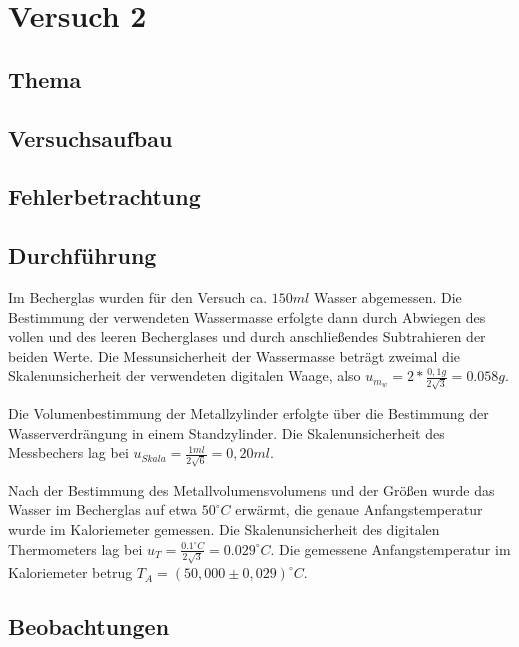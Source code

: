 \documentclass[
  9pt,
]{article}
\begin{document}
\hypertarget{versuch-2}{%
\section{Versuch 2}\label{versuch-2}}

\hypertarget{thema-1}{%
\subsection{Thema}\label{thema-1}}

\hypertarget{versuchsaufbau}{%
\subsection{Versuchsaufbau}\label{versuchsaufbau}}

\hypertarget{fehlerbetrachtung-1}{%
\subsection{Fehlerbetrachtung}\label{fehlerbetrachtung-1}}

\hypertarget{durchfuxfchrung}{%
\subsection{Durchführung}\label{durchfuxfchrung}}

Im Becherglas wurden für den Versuch ca. \(150ml\) Wasser abgemessen.
Die Bestimmung der verwendeten Wassermasse erfolgte dann durch Abwiegen
des vollen und des leeren Becherglases und durch anschließendes
Subtrahieren der beiden Werte. Die Messunsicherheit der Wassermasse
beträgt zweimal die Skalenunsicherheit der verwendeten digitalen Waage,
also \(u_{m_w}=2*\frac{0,1g}{2\sqrt{3}}=0.058g\).

Die Volumenbestimmung der Metallzylinder erfolgte über die Bestimmung
der Wasserverdrängung in einem Standzylinder. Die Skalenunsicherheit des
Messbechers lag bei \(u_{Skala}=\frac{1ml}{2\sqrt{6}}=0,20ml\).

Nach der Bestimmung des Metallvolumensvolumens und der Größen wurde das
Wasser im Becherglas auf etwa \(50^\circ C\) erwärmt, die genaue
Anfangstemperatur wurde im Kaloriemeter gemessen. Die Skalenunsicherheit
des digitalen Thermometers lag bei
\(u_T = \frac{0.1^\circ C}{2\sqrt{3}} = 0.029^\circ C\). Die gemessene
Anfangstemperatur im Kaloriemeter betrug
\(T_A=(50,000\pm 0,029)^\circ C\).

\hypertarget{beobachtungen-1}{%
\subsection{Beobachtungen}\label{beobachtungen-1}}
\end{document}
